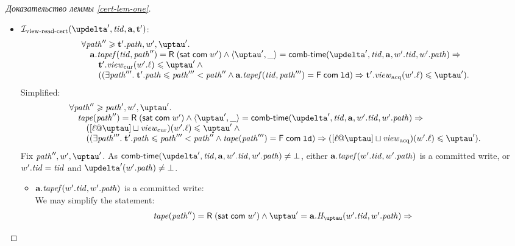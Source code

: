 \begin{proof}[Доказательство леммы \ref{cert-lem-one}]
\begin{itemize}
\begin{itemize}
        \item $\invViewReadCERT(\delta', \tId, \aT, \tT')$: \\
          \[\begin{array}{l}
            \forall \cpath'' \ge \tT'.\cpath, \w', \tau'. \\
            \quad \aT.\tapef(\tId, \cpath'') = \tapeRead{(\tapeSatisfied{\Committed}{\w'})} \land
               \angled{\tau', \_} = \deltaHmap(\delta', \tId, \aT, \w'.\tId, \w'.\cpath) \Rightarrow \\
            \quad \quad \tT'.\Rcur(\w'.\loc) \le \tau' \land {} \\
            \quad \quad ((\exists \cpath'''. \; \tT'.\cpath \le \cpath''' < \cpath'' \land 
                         \aT.\tapef(\tId, \cpath''') = \tapeFence{\Committed}{\LD}) \Rightarrow \tT'.\Racq(\w'.\loc) \le \tau'). \\
          \end{array}\]
          Simplified:
          \[\begin{array}{l}
            \forall \cpath'' \ge \cpath', \w', \tau'. \\
            \quad \tape(\cpath'') = \tapeRead{(\tapeSatisfied{\Committed}{\w'})} \land
               \angled{\tau', \_} = \deltaHmap(\delta', \tId, \aT, \w'.\tId, \w'.\cpath) \Rightarrow \\
            \quad \quad ([\loc @ \tau] \sqcup \Rcur)(\w'.\loc) \le \tau' \land {} \\
            \quad \quad ((\exists \cpath'''. \; \tT'.\cpath \le \cpath''' < \cpath'' \land 
                         \tape(\cpath''') = \tapeFence{\Committed}{\LD}) \Rightarrow
                         ([\loc @ \tau] \sqcup \Racq)(\w'.\loc) \le \tau'). \\
          \end{array}\]
          Fix $\cpath'', \w', \tau'$.
          As $\deltaHmap(\delta', \tId, \aT, \w'.\tId, \w'.\cpath) \not = \bot$,
          either $\mathbf{a}.\mathit{tapef}(w'.\mathit{tid}, w'.\mathit{path})$ is a committed write, or $w'.\mathit{tid} = \mathit{tid}$ and
          $\delta'(\w'.\cpath) \not = \bot$.
          \begin{itemize}
            \item $\mathbf{a}.\mathit{tapef}(w'.\mathit{tid}, w'.\mathit{path})$ is a committed write: \\
              We may simplify the statement:
          \[\begin{array}{l}
            \tape(\cpath'') = \tapeRead{(\tapeSatisfied{\Committed}{\w'})} \land
               \tau' = \aT.\tmap(\w'.\tId, \w'.\cpath) \Rightarrow \\

\end{array}\]
\end{itemize}
\end{itemize}
\end{itemize}
\end{proof}
